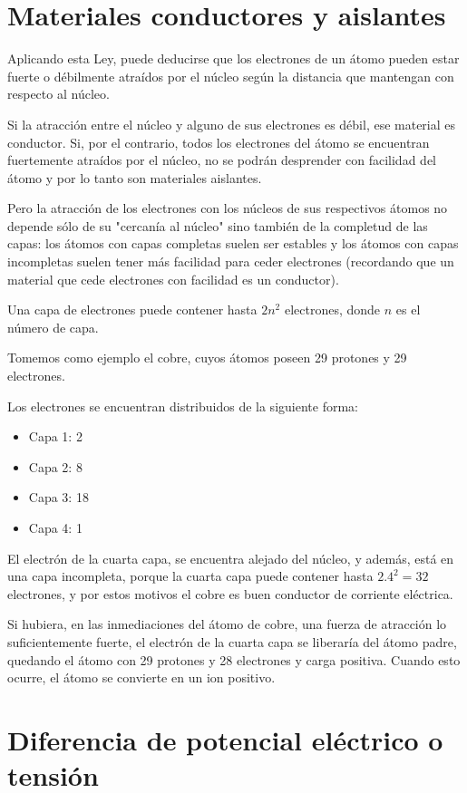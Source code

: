 \section{Materiales conductores y aislantes}

Aplicando esta Ley, puede deducirse que los electrones de un átomo pueden estar fuerte o débilmente atraídos por el núcleo según la distancia que mantengan con respecto al núcleo.

Si la atracción entre el núcleo y alguno de sus electrones es débil, ese material es conductor. Si, por el contrario, todos los electrones del átomo se encuentran fuertemente atraídos por el núcleo, no se podrán desprender con facilidad del átomo y por lo tanto son materiales aislantes.

Pero la atracción de los electrones con los núcleos de sus respectivos átomos no depende sólo de su "cercanía al núcleo" sino también de la completud de las capas: los átomos con capas completas suelen ser estables y los átomos con capas incompletas suelen tener más facilidad para ceder electrones (recordando que un material que cede electrones con facilidad es un conductor).

Una capa de electrones puede contener hasta $2n^{2}$ electrones, donde $n$ es el número de capa.

Tomemos como ejemplo el cobre, cuyos átomos poseen 29 protones y 29 electrones.

Los electrones se encuentran distribuidos de la siguiente forma:
\begin{itemize}
	\item Capa 1: 2
	\item Capa 2: 8
	\item Capa 3: 18
	\item Capa 4: 1
\end{itemize}

El electrón de la cuarta capa, se encuentra alejado del núcleo, y además, está en una capa incompleta, porque la cuarta capa puede contener hasta $2.4^{2}=32$ electrones, y por estos motivos el cobre es buen conductor de corriente eléctrica.

Si hubiera, en las inmediaciones del átomo de cobre, una fuerza de atracción lo suficientemente fuerte, el electrón de la cuarta capa se liberaría del átomo padre, quedando el átomo con 29 protones y 28 electrones y carga positiva. Cuando esto ocurre, el átomo se convierte en un ion positivo.

\section{Diferencia de potencial eléctrico o tensión}


